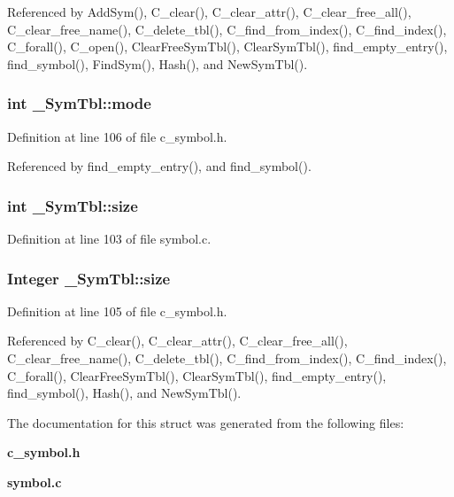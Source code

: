 Referenced by Add\-Sym(), C\_\-clear(), C\_\-clear\_\-attr(), C\_\-clear\_\-free\_\-all(), C\_\-clear\_\-free\_\-name(), C\_\-delete\_\-tbl(), C\_\-find\_\-from\_\-index(), C\_\-find\_\-index(), C\_\-forall(), C\_\-open(), Clear\-Free\-Sym\-Tbl(), Clear\-Sym\-Tbl(), find\_\-empty\_\-entry(), find\_\-symbol(), Find\-Sym(), Hash(), and New\-Sym\-Tbl().
\subsubsection{\setlength{\rightskip}{0pt plus 5cm}int \bf{\_\-Sym\-Tbl::mode}}\label{struct__SymTbl_06e77d1d7367c9f457a86b47ceac272a}




Definition at line 106 of file c\_\-symbol.h.

Referenced by find\_\-empty\_\-entry(), and find\_\-symbol().
\subsubsection{\setlength{\rightskip}{0pt plus 5cm}int \bf{\_\-Sym\-Tbl::size}}\label{struct__SymTbl_49d772c761edd46ac125b561ac12a337}




Definition at line 103 of file symbol.c.
\subsubsection{\setlength{\rightskip}{0pt plus 5cm}\bf{Integer} \bf{\_\-Sym\-Tbl::size}}\label{struct__SymTbl_4b638681370b57b80e148cb14ede3940}




Definition at line 105 of file c\_\-symbol.h.

Referenced by C\_\-clear(), C\_\-clear\_\-attr(), C\_\-clear\_\-free\_\-all(), C\_\-clear\_\-free\_\-name(), C\_\-delete\_\-tbl(), C\_\-find\_\-from\_\-index(), C\_\-find\_\-index(), C\_\-forall(), Clear\-Free\-Sym\-Tbl(), Clear\-Sym\-Tbl(), find\_\-empty\_\-entry(), find\_\-symbol(), Hash(), and New\-Sym\-Tbl().

The documentation for this struct was generated from the following files:\begin{CompactItemize}
\item 
\bf{c\_\-symbol.h}\item 
\bf{symbol.c}\end{CompactItemize}
